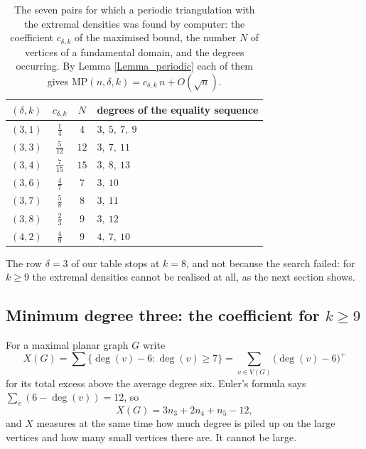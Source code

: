 \documentclass[10pt,a4paper]{article}
\begin{document}
\begin{table}[htbp]
\begin{center}
\renewcommand{\arraystretch}{1.35}%
\begin{tabular}{|c|c|c|l|}
\hline
$(\delta ,k)$ & $c_{\delta ,k}$ & $N$ & degrees of the equality sequence\\[2pt] \hline
$(3,1)$ & $\tfrac{1}{4}$ & $4$ & $3,\ 5,\ 7,\ 9$\\
$(3,3)$ & $\tfrac{5}{12}$ & $12$ & $3,\ 7,\ 11$\\
$(3,4)$ & $\tfrac{7}{15}$ & $15$ & $3,\ 8,\ 13$\\
$(3,6)$ & $\tfrac{4}{7}$ & $7$ & $3,\ 10$\\
$(3,7)$ & $\tfrac{5}{8}$ & $8$ & $3,\ 11$\\
$(3,8)$ & $\tfrac{2}{3}$ & $9$ & $3,\ 12$\\
$(4,2)$ & $\tfrac{4}{9}$ & $9$ & $4,\ 7,\ 10$\\
\hline
\end{tabular}
\end{center}
\caption{The seven pairs for which a periodic triangulation with the extremal densities was found by computer:
the coefficient $c_{\delta ,k}$ of the maximised bound, the number $N$ of vertices of a fundamental domain, and
the degrees occurring. By Lemma \ref{Lemma_periodic} each of them gives
$\mathrm{MP}(n,\delta ,k)=c_{\delta ,k}\,n+O(\sqrt{n})$.}%
\label{Tab_computer}%
\end{table}

The row $\delta =3$ of our table stops at $k=8$, and not because the search failed: for $k\geq 9$ the extremal
densities cannot be realised at all, as the next section shows.

\subsection{Minimum degree three: the coefficient for $k\geq 9$}
\label{Sec_deg3exact}

For a maximal planar graph $G$ write
\[
X(G)=\sum \{\deg (v)-6:\deg (v)\geq 7\}=\sum_{v\in V(G)}\bigl(\deg (v)-6\bigr)^{+}
\]
for its total excess above the average degree six. Euler's formula says $\sum_{v}(6-\deg (v))=12$, so
\begin{equation}
X(G)=3n_{3}+2n_{4}+n_{5}-12,\label{eq_excess}
\end{equation}
and $X$ measures at the same time how much degree is piled up on the large vertices and how many small vertices
there are. It cannot be large.
\end{document}
